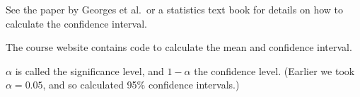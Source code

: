 
\begin{slide}

See the paper by Georges et al.\ or a statistics text book for details on how
to calculate the confidence interval.  

The course website contains code to calculate the mean and confidence
interval. 

$\alpha$ is called the significance level, and $1-\alpha$ the confidence
level.  (Earlier we took $\alpha = 0.05$, and so calculated 95\% confidence
intervals.) 
\end{slide}





